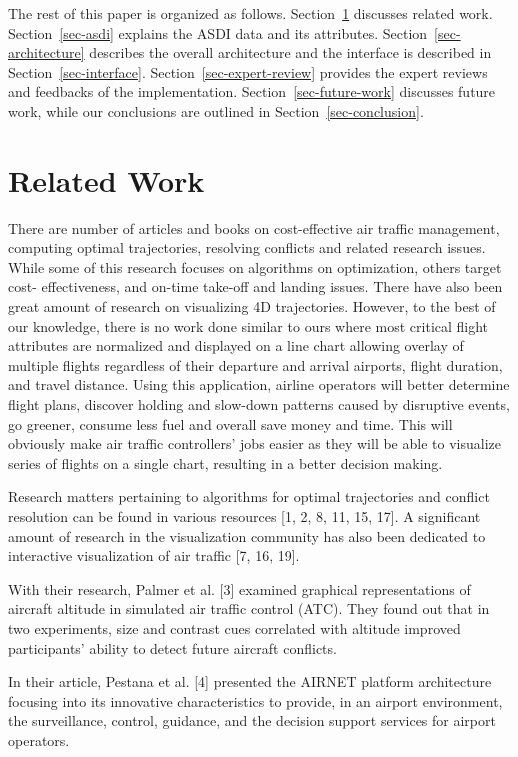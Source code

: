\documentclass{sig-alternate}
\begin{document}
The rest of this paper is organized as follows. Section~\ref{sec-related-work}
discusses related
work. Section~\ref{sec-asdi} explains the ASDI data and its attributes. 
Section~\ref{sec-architecture} describes
the overall architecture and the interface is described in Section~\ref{sec-interface}.
Section~\ref{sec-expert-review}
provides the expert reviews
and feedbacks of the implementation. Section~\ref{sec-future-work}
discusses future work, while our conclusions
are outlined in Section~\ref{sec-conclusion}.

\section{Related Work}
\label{sec-related-work}

There are number of articles and books on
cost-effective air traffic management, computing
optimal trajectories, resolving conflicts and related
research issues. While some of this research focuses
on algorithms on optimization, others target cost-
effectiveness, and on-time take-off and landing
issues. There have also been great amount of
research on visualizing 4D trajectories. However,
to the best of our knowledge, there is no work
done similar to ours where most critical flight
attributes are normalized and displayed on a line
chart allowing overlay of multiple flights regardless
of their departure and arrival airports, flight
duration, and travel distance. Using this application,
airline operators will better determine flight plans,
discover holding and slow-down patterns caused by
disruptive events, go greener, consume less fuel and
overall save money and time. This will obviously
make air traffic controllers’ jobs easier as they will
be able to visualize series of flights on a single
chart, resulting in a better decision making.

Research matters pertaining to algorithms for
optimal trajectories and conflict resolution can be
found in various resources [1, 2, 8, 11, 15, 17]. A
significant amount of research in the visualization
community has also been dedicated to interactive
visualization of air traffic [7, 16, 19].

With their research, Palmer et al. [3] examined
graphical representations of aircraft altitude in
simulated air traffic control (ATC). They found
out that in two experiments, size and contrast cues
correlated with altitude improved participants'
ability to detect future aircraft conflicts.

In their article, Pestana et al. [4] presented
the AIRNET platform architecture focusing into its
innovative characteristics to provide, in an airport
environment, the surveillance, control, guidance,
and the decision support services for airport
operators.
\end{document}
